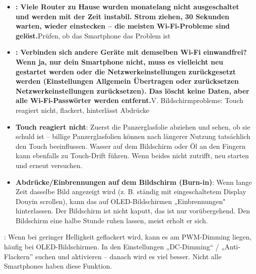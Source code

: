 \begin{itemize}
  \item \textbf{: Viele Router zu Hause wurden monatelang nicht ausgeschaltet und werden mit der Zeit instabil. Strom ziehen, 30 Sekunden warten, wieder einstecken – die meisten Wi-Fi-Probleme sind gelöst.}Prüfen, ob das Smartphone das Problem ist
  \item \textbf{: Verbinden sich andere Geräte mit demselben Wi-Fi einwandfrei? Wenn ja, nur dein Smartphone nicht, muss es vielleicht neu gestartet werden oder die Netzwerkeinstellungen zurückgesetzt werden (Einstellungen Allgemein Übertragen oder zurücksetzen Netzwerkeinstellungen zurücksetzen). Das löscht keine Daten, aber alle Wi-Fi-Passwörter werden entfernt.}V. Bildschirmprobleme: Touch reagiert nicht, flackert, hinterlässt Abdrücke
  \item \textbf{Touch reagiert nicht}: Zuerst die Panzerglasfolie abziehen und sehen, ob sie schuld ist – billige Panzerglasfolien können nach längerer Nutzung tatsächlich den Touch beeinflussen. Wasser auf dem Bildschirm oder Öl an den Fingern kann ebenfalls zu Touch-Drift führen. Wenn beides nicht zutrifft, neu starten und erneut versuchen.
  \item \textbf{Abdrücke/Einbrennungen auf dem Bildschirm (Burn-in)}: Wenn lange Zeit dasselbe Bild angezeigt wird (z. B. ständig mit eingeschaltetem Display Douyin scrollen), kann das auf OLED-Bildschirmen „Einbrennungen" hinterlassen. Der Bildschirm ist nicht kaputt, das ist nur vorübergehend. Den Bildschirm eine halbe Stunde ruhen lassen, meist erholt er sich.
\end{itemize}


: Wenn bei geringer Helligkeit geflackert wird, kann es am PWM-Dimming liegen, häufig bei OLED-Bildschirmen. In den Einstellungen „DC-Dimming“ / „Anti-Flackern” suchen und aktivieren – danach wird es viel besser. Nicht alle Smartphones haben diese Funktion.

